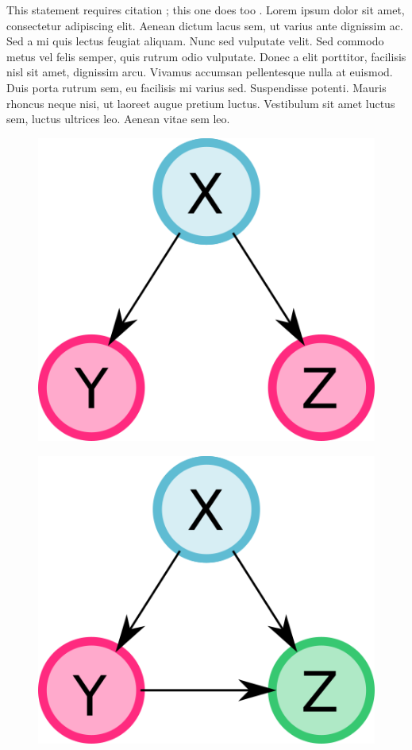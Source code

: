 \documentclass[12pt]{diazessay} %
\begin{document}
This statement requires citation \cite{fibration2019}; this one does too \cite{Cardon1982} \cite{Boldi2006} \cite{Tarjan1987} \cite{Stewart2006}. Lorem ipsum dolor sit amet, consectetur adipiscing elit. Aenean dictum lacus sem, ut varius ante dignissim ac. Sed a mi quis lectus feugiat aliquam. Nunc sed vulputate velit. Sed commodo metus vel felis semper, quis rutrum odio vulputate. Donec a elit porttitor, facilisis nisl sit amet, dignissim arcu. Vivamus accumsan pellentesque nulla at euismod. Duis porta rutrum sem, eu facilisis mi varius sed. Suspendisse potenti. Mauris rhoncus neque nisi, ut laoreet augue pretium luctus. Vestibulum sit amet luctus sem, luctus ultrices leo. Aenean vitae sem leo.

\begin{figure}[h]
	\centering
	\includegraphics[scale=0.4]{Figures/ex1.png}
\end{figure}
\begin{figure}[h]
	\centering
	\includegraphics[scale=0.4]{Figures/ex2.png}
\end{figure}
\end{document}
